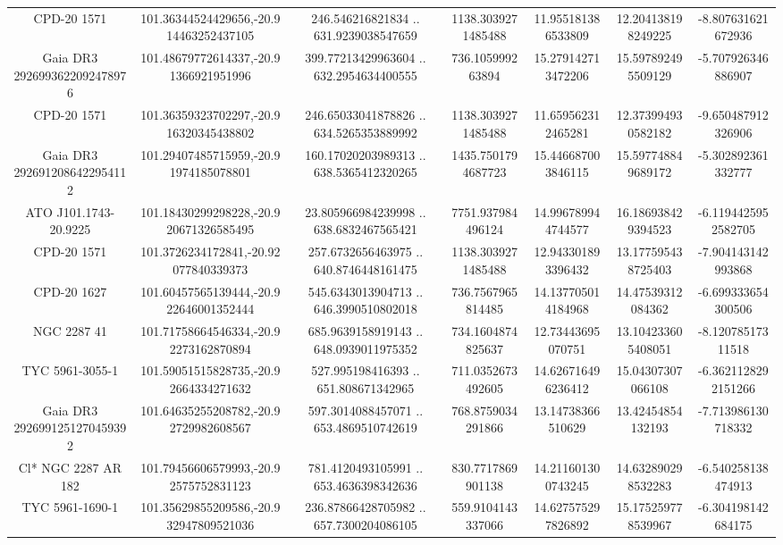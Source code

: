\begin{table}
\begin{tabular}{ccccccc}
CPD-20  1571 & 101.36344524429656,-20.914463252437105 & 246.546216821834 .. 631.9239038547659 & 1138.3039271485488 & 11.955181386533809 & 12.204138198249225 & -8.807631621672936 \\
Gaia DR3 2926993622092478976 & 101.48679772614337,-20.91366921951996 & 399.77213429963604 .. 632.2954634400555 & 736.105999263894 & 15.279142713472206 & 15.597892495509129 & -5.707926346886907 \\
CPD-20  1571 & 101.36359323702297,-20.916320345438802 & 246.65033041878826 .. 634.5265353889992 & 1138.3039271485488 & 11.659562312465281 & 12.373994930582182 & -9.650487912326906 \\
Gaia DR3 2926912086422954112 & 101.29407485715959,-20.91974185078801 & 160.17020203989313 .. 638.5365412320265 & 1435.7501794687723 & 15.446687003846115 & 15.597748849689172 & -5.302892361332777 \\
ATO J101.1743-20.9225 & 101.18430299298228,-20.920671326585495 & 23.805966984239998 .. 638.6832467565421 & 7751.937984496124 & 14.996789944744577 & 16.186938429394523 & -6.1194425952582705 \\
CPD-20  1571 & 101.3726234172841,-20.92077840339373 & 257.6732656463975 .. 640.8746448161475 & 1138.3039271485488 & 12.943301893396432 & 13.177595438725403 & -7.904143142993868 \\
CPD-20  1627 & 101.60457565139444,-20.922646001352444 & 545.6343013904713 .. 646.3990510802018 & 736.7567965814485 & 14.137705014184968 & 14.47539312084362 & -6.699333654300506 \\
NGC  2287    41 & 101.71758664546334,-20.92273162870894 & 685.9639158919143 .. 648.0939011975352 & 734.1604874825637 & 12.73443695070751 & 13.104233605408051 & -8.12078517311518 \\
TYC 5961-3055-1 & 101.59051515828735,-20.92664334271632 & 527.995198416393 .. 651.808671342965 & 711.0352673492605 & 14.626716496236412 & 15.04307307066108 & -6.3621128292151266 \\
Gaia DR3 2926991251270459392 & 101.64635255208782,-20.92729982608567 & 597.3014088457071 .. 653.4869510742619 & 768.8759034291866 & 13.14738366510629 & 13.42454854132193 & -7.713986130718332 \\
Cl* NGC 2287     AR     182 & 101.79456606579993,-20.92575752831123 & 781.4120493105991 .. 653.4636398342636 & 830.7717869901138 & 14.211601300743245 & 14.632890298532283 & -6.540258138474913 \\
TYC 5961-1690-1 & 101.35629855209586,-20.932947809521036 & 236.87866428705982 .. 657.7300204086105 & 559.9104143337066 & 14.627575297826892 & 15.175259778539967 & -6.304198142684175 \\

\end{tabular}
\end{table}
